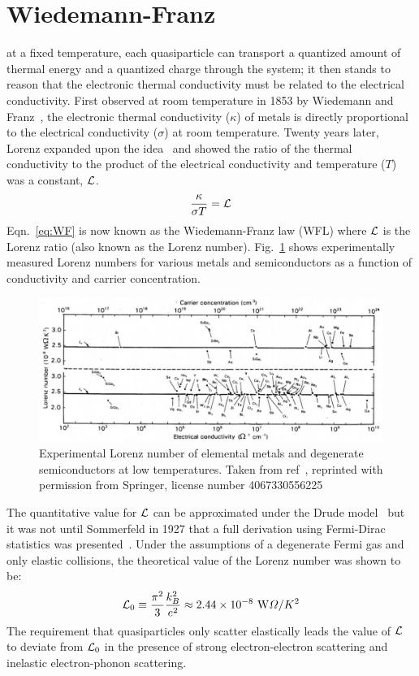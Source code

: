 \section{Wiedemann-Franz}
 at a fixed temperature, each quasiparticle can transport a quantized amount of thermal energy and a quantized charge through the system; it then stands to reason that the electronic thermal conductivity must be related to the electrical conductivity. First observed at room temperature in 1853 by Wiedemann and Franz~\cite{franz_ueber_1853},  the electronic thermal conductivity ($\kappa$) of metals is directly proportional to the electrical conductivity ($\sigma$) at room temperature. Twenty years later, Lorenz expanded upon the idea~\cite{lorenz_bestimmung_1872} and showed the ratio of the thermal conductivity to the product of the electrical conductivity and temperature ($T$) was a constant, $\mathcal{L}$.
\begin{equation}\label{eq:WF}
\frac{\kappa}{\sigma T} = \mathcal{L}
\end{equation}
Eqn.~\ref{eq:WF} is now known as the Wiedemann-Franz law (WFL) where $\mathcal{L}$ is the Lorenz ratio (also known as the Lorenz number). Fig.~\ref{fig:WF_in_metals} shows experimentally measured Lorenz numbers for various metals and semiconductors as a function of conductivity and carrier concentration.
\begin{figure}
\centering
\includegraphics[width=\textwidth]{figures/electronic_cooling/WF_in_metals.png}
\caption{Experimental Lorenz number of elemental metals and degenerate semiconductors at low temperatures. Taken from ref~\cite{kumar_experimental_1993}, reprinted with permission from Springer, license number 4067330556225}
\label{fig:WF_in_metals}
\end{figure}
The quantitative value for $\mathcal{L}$ can be approximated under the Drude model~\cite{ashcroft_solid_1976} but it was not until Sommerfeld in 1927 that a full derivation using Fermi-Dirac statistics was presented~\cite{sommerfeld_zur_1927}. Under the assumptions of a degenerate Fermi gas and only elastic collisions, the theoretical value of the Lorenz number was shown to be:
\begin{equation}
\mathcal{L}_0 \equiv \frac{\pi^2}{3}\frac{k_B^2}{e^2} \approx 2.44\times10^{-8}~\mathrm{W}\Omega/K^2
\end{equation}
The requirement that quasiparticles only scatter elastically leads the value of $\mathcal{L}$ to deviate from $\mathcal{L}_0$ in the presence of strong electron-electron scattering and inelastic electron-phonon scattering.

